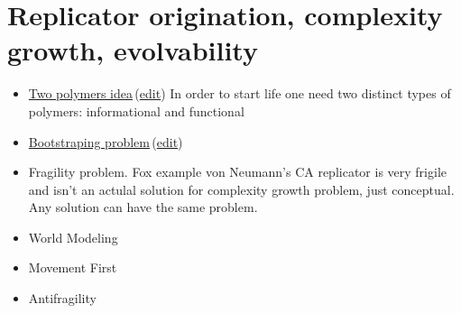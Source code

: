 \documentclass[12pt]{paper}
\newcommand{\wikilink}[2] { \href{#1.pdf}{#2}\,(\href{#1.tex}{edit})}
\begin{document}
\section{Replicator origination, complexity growth, evolvability}
\begin{itemize}
\item \wikilink{2PMod2}{Two polymers idea} In order to start life one need two distinct types 
of polymers: informational and functional
\item \wikilink{bootstraping_problem}{Bootstraping problem}
\item Fragility problem. Fox example von Neumann's CA replicator is very frigile and isn't an 
actulal solution for complexity growth problem, just conceptual. Any solution can have the same 
problem.
 \item World Modeling
\item Movement First
\item Antifragility
\end{itemize}
\end{document}
